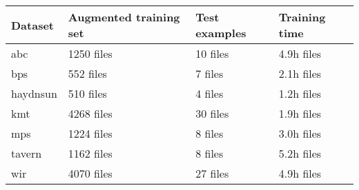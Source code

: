 \begin{tabular}{l|lll}
Dataset        & Augmented training set & Test examples & Training time \\ \hline
\gls{abc}      & 1250  files                 & 10 files           & 4.9h files         \\
\gls{bps}      & 552   files                 & 7  files           & 2.1h files         \\
\gls{haydnsun} & 510   files                 & 4  files           & 1.2h files         \\
\gls{kmt}      & 4268  files                 & 30 files           & 1.9h files         \\
\gls{mps}      & 1224  files                 & 8  files           & 3.0h files         \\
\gls{tavern}   & 1162  files                 & 8  files           & 5.2h files         \\
\gls{wir}      & 4070  files                 & 27 files           & 4.9h files        
\end{tabular}
